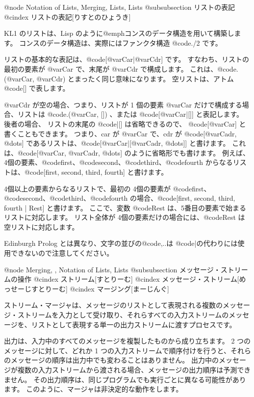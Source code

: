 {{@node Notation of Lists, Merging, Lists, Lists
@subsubsection リストの表記
@cindex リストの表記[りすとのひょうき]

KL1 のリストは、Lisp のように@emph{コンス}のデータ構造を用いて構築します。
コンスのデータ構造は、実際にはファンクタ構造 @code{./2} です。

リストの基本的な表記は、@code{[@var{Car}|@var{Cdr}]} です。
すなわち、リストの最初の要素が @var{Car} で、末尾が @var{Cdr} で構成します。
これは、@code{.(@var{Car}, @var{Cdr})} とまったく同じ意味になります。
空リストは、アトム @code{[]} で表します。

@var{Cdr} が空の場合、つまり、リストが 1 個の要素 @var{Car} だけで構成する場合、リストは @code{.(@var{Car}, [])} 、または @code{[@var{Car}|[]]} と表記します。
後者の場合、 リストの末尾の @code{|[]} は省略できるので、 @code{[@var{Car}]} と書くこともできます。
つまり、car が @var{Car} で、cdr が @code{[@var{Cadr}, @dots{}]} であるリストは、@code{[@var{Car}|[@var{Cadr}, @dots{}]]} と書けます。
これは、@code{[@var{Car}, @var{Cadr}, @dots{}]} のように省略形でも書けます。
例えば、4個の要素、@code{first}、@code{second}、@code{third}、@code{fourth} からなるリストは、@code{[first, second, third, fourth]} と書けます。

4個以上の要素からなるリストで、最初の 4個の要素が @code{first}、@code{second}、@code{third}、@code{fourth} の場合、@code{[first, second, third, fourth | Rest]} と書けます。
ここで、変数 @code{Rest} は、5番目の要素で始まるリストに対応します。
リスト全体が 4個の要素だけの場合には、@code{Rest} は空リストに対応します。

Edinburgh Prolog とは異なり、文字の並びの@code{,..}は @code{|}の代わりには使用できないので注意してください。

@node Merging,  , Notation of Lists, Lists
@subsubsection メッセージ・ストリームの操作
@cindex ストリーム[すとりーむ]
@cindex メッセージ・ストリーム[めっせーじすとりーむ]
@cindex マージング[まーじんぐ]

ストリーム・マージャは、メッセージのリストとして表現される複数のメッセージ・ストリームを入力として受け取り、それらすべての入力ストリームのメッセージを、リストとして表現する単一の出力ストリームに渡すプロセスです。

出力は、入力中のすべてのメッセージを複製したものから成り立ちます。
2 つのメッセージに対して、どれか 1 つの入力ストリームで順序付けを行うと、それらのメッセージの順序は出力中でも変わることはありません。
出力中のメッセージが複数の入力ストリームから渡される場合、メッセージの出力順序は予測できません。
その出力順序は、同じプログラムでも実行ごとに異なる可能性があります。
このように、マージャは非決定的な動作をします。

}}
